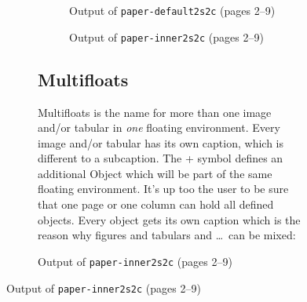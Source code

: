 \documentclass[twoside,paper=a4,usegeometry,index=totoc]{scrartcl}
\begin{document}
\begin{figure}[p]
\begin{figure}[p]
\begin{figure}
\caption{Output of \texttt{paper-default2s2c} (pages 2--9)}\label{paper-default2s2c}
\end{figure}


\begin{figure}
\hfill
{}\hfill
{}\hfill
{}

\hfill
{}\hfill
{}\hfill
{}

\caption{Output of \texttt{paper-inner2s2c} (pages 2--9)}\label{paper-inner2s2c}
\end{figure}


\FloatBarrier


\subsection{Multifloats}
Multifloats is the name for more than one image and/or tabular in \emph{one} floating
environment. Every image and/or tabular has its own caption, which is different to
a subcaption. 
The + symbol defines an additional Object which will be part of the same floating environment.
It's up too the user to be sure that one page or one column can hold all defined objects.
Every object gets its own caption which is the reason why figures and tabulars and \ldots\ 
can be mixed:


\end{figure}
\end{figure}
\end{document}
